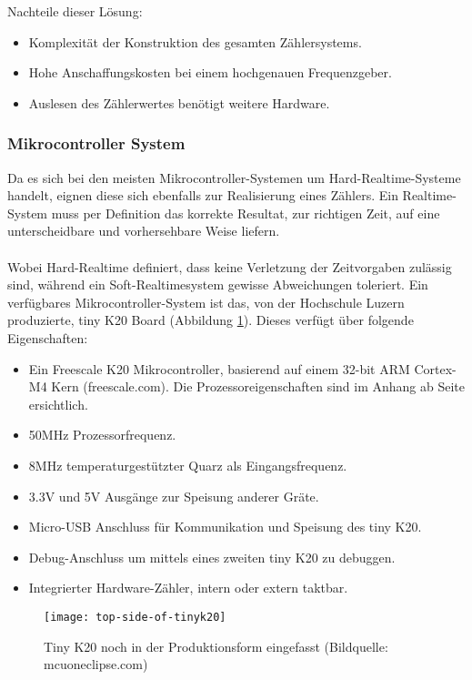     Nachteile dieser Lösung:
    \begin{itemize}
    	\item Komplexität der Konstruktion des gesamten Zählersystems.
    	\item Hohe Anschaffungskosten bei einem hochgenauen Frequenzgeber.
    	\item Auslesen des Zählerwertes benötigt weitere Hardware.
    \end{itemize}
	\subsubsection{Mikrocontroller System}
   		Da es sich bei den meisten Mikrocontroller-Systemen um Hard-Realtime-Systeme handelt, eignen diese sich ebenfalls zur Realisierung eines Zählers. Ein Realtime-System muss per Definition das korrekte Resultat, zur richtigen Zeit, auf eine unterscheidbare und vorhersehbare Weise liefern.\\
           \\
		Wobei Hard-Realtime definiert, dass keine Verletzung der Zeitvorgaben zulässig sind, während ein Soft-Realtimesystem gewisse Abweichungen toleriert. Ein verfügbares Mikrocontroller-System ist das, von der Hochschule Luzern produzierte, tiny K20 Board (Abbildung \ref{fig:TinyK20}). Dieses verfügt über folgende Eigenschaften:
		\begin{itemize}
			\item Ein Freescale K20 Mikrocontroller, basierend auf einem  32-bit ARM Cortex-M4 Kern (freescale.com). Die Prozessoreigenschaften sind im Anhang ab Seite \pageref{app:K20PB} ersichtlich.
			\item 50MHz Prozessorfrequenz.
			\item 8MHz temperaturgestützter Quarz als Eingangsfrequenz.
			\item 3.3V und 5V Ausgänge zur Speisung anderer Gräte.
			\item Micro-USB Anschluss für Kommunikation und Speisung des tiny K20.
			\item Debug-Anschluss um mittels eines zweiten tiny K20 zu debuggen.
			\item Integrierter Hardware-Zähler, intern oder extern taktbar.
		\end{itemize}
		\begin{figure}[H]
        	\centering
        	\texttt{[image: top-side-of-tinyk20]}
        	\caption{Tiny K20 noch in der Produktionsform eingefasst (Bildquelle: mcuoneclipse.com)}
        	\label{fig:TinyK20}
    	\end{figure}
